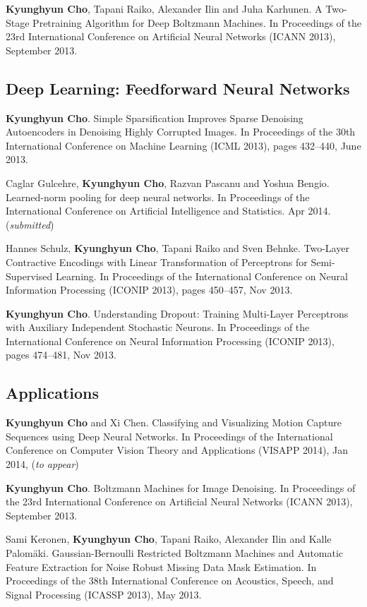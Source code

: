 \documentclass[11pt, oneside]{essay}
\begin{document}
\textbf{Kyunghyun Cho}, Tapani Raiko, Alexander Ilin and Juha
Karhunen. A Two-Stage Pretraining Algorithm for Deep
Boltzmann Machines. In Proceedings of the 23rd International
Conference on Artificial Neural Networks (ICANN 2013),
September 2013.



\subsection{Deep Learning: Feedforward Neural Networks}

\textbf{Kyunghyun Cho}. Simple Sparsification Improves Sparse
Denoising Autoencoders in Denoising Highly Corrupted Images.
In Proceedings of the 30th International Conference on
Machine Learning (ICML 2013), pages 432--440, June 2013.

Caglar Gulcehre, \textbf{Kyunghyun Cho}, Razvan Pascanu and Yoshua Bengio.
Learned-norm pooling for deep neural networks. 
In Proceedings of the International Conference on Artificial
Intelligence and Statistics. Apr 2014. (\textit{submitted})

Hannes Schulz, \textbf{Kyunghyun Cho}, Tapani Raiko and Sven Behnke.
Two-Layer Contractive Encodings with Linear Transformation
of Perceptrons for Semi-Supervised Learning. 
In Proceedings of the International Conference on Neural
Information Processing (ICONIP 2013), pages 450--457, Nov 2013.

\textbf{Kyunghyun Cho}.
Understanding Dropout: Training Multi-Layer Perceptrons with
Auxiliary Independent Stochastic Neurons. 
In Proceedings of the International Conference on Neural
Information Processing (ICONIP 2013), pages 474--481, Nov 2013.


\subsection{Applications}

\textbf{Kyunghyun Cho} and Xi Chen.  Classifying and
Visualizing Motion Capture Sequences using Deep Neural
Networks.  In Proceedings of the International Conference on
Computer Vision Theory and Applications (VISAPP 2014), Jan
2014, (\textit{to appear})

\textbf{Kyunghyun Cho}. Boltzmann Machines for Image Denoising. In
Proceedings of the 23rd International Conference on
Artificial Neural Networks (ICANN 2013), September 2013.

Sami Keronen, \textbf{Kyunghyun Cho}, Tapani Raiko, Alexander Ilin
and Kalle Palom\"aki. Gaussian-Bernoulli Restricted Boltzmann
Machines and Automatic Feature Extraction for Noise Robust
Missing Data Mask Estimation. In Proceedings of the 38th
International Conference on Acoustics, Speech, and Signal
Processing (ICASSP 2013), May 2013.
\end{document}
